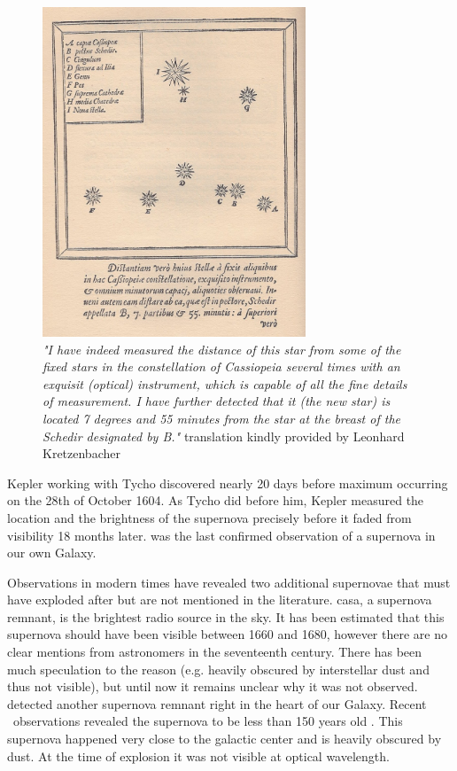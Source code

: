 \begin{figure}[htbp] %
   \centering
   \includegraphics[width=0.7\textwidth]{chapter_intro/plots/Tycho_Cas_SN1572.jpg} 
   \caption{\textit{"I have indeed measured the distance of this star from some of the fixed stars in the constellation of Cassiopeia several times with an exquisit (optical) instrument, which is capable of all the fine details of measurement. I have further detected that it (the new star) is located 7 degrees and 55 minutes from the star at the breast of the Schedir designated by B."} translation kindly provided by Leonhard Kretzenbacher}
   \label{fig:sn1572_tycho_chart}
\end{figure}

Kepler working with Tycho discovered  nearly 20 days before maximum occurring on the 28th of October 1604. As Tycho did before him, Kepler measured the location and the brightness of the supernova precisely \citep{kepler1606} before it faded from visibility 18 months later.   was the last confirmed observation of a supernova in our own Galaxy. 

Observations in modern times have revealed two additional supernovae that must have exploded after  but are not mentioned in the literature. \gls{casa}, a supernova remnant, is the brightest radio source in the sky. It has been estimated that this supernova should have been visible between 1660 and 1680, however there are no clear mentions from astronomers in the seventeenth century. There has been much speculation to the reason (e.g. heavily obscured by interstellar dust and thus not visible), but until now it remains unclear why it was not observed. \citet{1984Natur.312..527G} detected another supernova remnant right in the heart of our Galaxy. Recent \xray\ observations revealed the supernova to be less than 150 years old \cite{2008ApJ...680L..41R}. This supernova happened very close to the galactic center and is heavily obscured by dust. At the time of explosion it was not visible at optical wavelength. 

